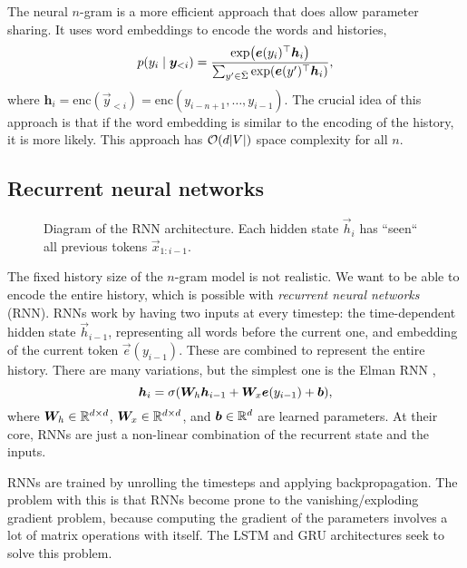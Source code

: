 The neural $n$-gram \citep{bengio2000neural} is a more efficient approach that does allow parameter
sharing. It uses word embeddings to encode the words and
histories, \[
  p(y_i\mid \bm{y}_{<i}) = \frac{\exp \lft( \transpose{\vec{e}(y_i)} \vec{h}_i \rgt)}{\sum_{y'\in\bar{\Sigma}} \exp \lft( \transpose{\vec{e}(y')} \vec{h}_i \rgt)}
,\]
where $\bm{h}_i = \mathrm{enc}(\vec{y}_{<i}) =
\text{enc}(y_{i-n+1},\ldots,y_{i-1})$. The crucial idea of this approach is that if the word embedding
is similar to the encoding of the history, it is more likely. This approach has
$\bigo{d|V|}$ space complexity for all $n$.

\subsection{Recurrent neural networks}

\begin{figure}[ht]
    \centering
    \caption{Diagram of the RNN architecture. Each hidden state $\vec{h}_i$ has
    ``seen`` all previous tokens $\vec{x}_{1:{i-1}}$.}
    \label{fig:rnn}
\end{figure}

The fixed history size of the $n$-gram model is not realistic. We want to be
able to encode the entire history, which is possible with \textit{recurrent
neural networks} (RNN). RNNs work by having two inputs at every timestep: the
time-dependent hidden state $\vec{h}_{i-1}$, representing all words before the
current one, and embedding of the current token $\vec{e}(y_{i-1})$. These are
combined to represent the entire history. There are many variations, but the
simplest one is the Elman RNN \citep{elman1990finding}, \[
  \vec{h}_i = \sigma \lft( \mat{W}_h \vec{h}_{i-1} + \mat{W}_x \vec{e}(y_{i-1}) + \vec{b} \rgt)
,\] 
where $\bm{W}_h \in \mathbb{R}^{d\times d}$, $\bm{W}_x \in \mathbb{R}^{d\times d}$, and
$\bm{b} \in \mathbb{R}^d$ are learned parameters. At their core, RNNs are just a
non-linear combination of the recurrent state and the inputs.

RNNs are trained by unrolling the timesteps and applying backpropagation. The
problem with this is that RNNs become prone to the vanishing/exploding gradient
problem, because computing the gradient of the parameters involves a lot of
matrix operations with itself. The LSTM \citep{hochreiter1997long} and GRU
\citep{cho2014learning} architectures seek to solve this problem.

